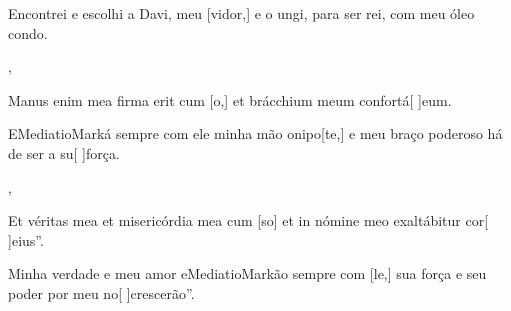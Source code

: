 {    {\item {}Encontrei e escolhi a Davi, meu [vidor,] e o ungi, para ser rei, com meu óleo condo.~\Responsorium},
  {\item {}Manus enim mea firma erit cum [o,] et brácchium meum confortá[ ]{e}um.~\Responsorium}%
    {\item {}EMediatioMarká sempre com ele minha mão onipo[te,] e meu braço poderoso há de ser a su[ ]{for}ça.~\Responsorium},
  {\item {}Et véritas mea et misericórdia mea cum [so] et in nómine meo exaltábitur cor[ ]{e}ius”.~\Responsorium}%
    {\item {}Minha verdade e meu amor eMediatioMarkão sempre com [le,] sua força e seu poder por meu no[ ]{cres}cerão”.~\Responsorium}
}